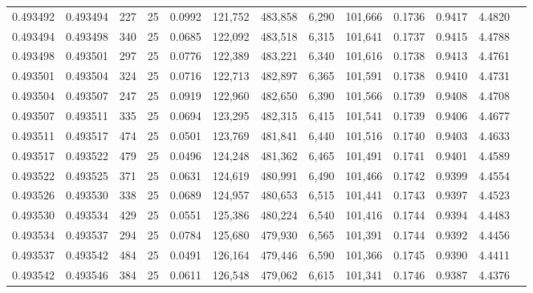 \begin{tabular}{rrrrrrrrrrrrr}
0.493492 & 0.493494 &   227 &  25 &                                     0.0992 & 121,752 & 483,858 &   6,290 & 101,666 & 0.1736 & 0.9417 & 4.4820 \\
0.493494 & 0.493498 &   340 &  25 &                                     0.0685 & 122,092 & 483,518 &   6,315 & 101,641 & 0.1737 & 0.9415 & 4.4788 \\
0.493498 & 0.493501 &   297 &  25 &                                     0.0776 & 122,389 & 483,221 &   6,340 & 101,616 & 0.1738 & 0.9413 & 4.4761 \\
0.493501 & 0.493504 &   324 &  25 &                                     0.0716 & 122,713 & 482,897 &   6,365 & 101,591 & 0.1738 & 0.9410 & 4.4731 \\
0.493504 & 0.493507 &   247 &  25 &                                     0.0919 & 122,960 & 482,650 &   6,390 & 101,566 & 0.1739 & 0.9408 & 4.4708 \\
0.493507 & 0.493511 &   335 &  25 &                                     0.0694 & 123,295 & 482,315 &   6,415 & 101,541 & 0.1739 & 0.9406 & 4.4677 \\
0.493511 & 0.493517 &   474 &  25 &                                     0.0501 & 123,769 & 481,841 &   6,440 & 101,516 & 0.1740 & 0.9403 & 4.4633 \\
0.493517 & 0.493522 &   479 &  25 &                                     0.0496 & 124,248 & 481,362 &   6,465 & 101,491 & 0.1741 & 0.9401 & 4.4589 \\
0.493522 & 0.493525 &   371 &  25 &                                     0.0631 & 124,619 & 480,991 &   6,490 & 101,466 & 0.1742 & 0.9399 & 4.4554 \\
0.493526 & 0.493530 &   338 &  25 &                                     0.0689 & 124,957 & 480,653 &   6,515 & 101,441 & 0.1743 & 0.9397 & 4.4523 \\
0.493530 & 0.493534 &   429 &  25 &                                     0.0551 & 125,386 & 480,224 &   6,540 & 101,416 & 0.1744 & 0.9394 & 4.4483 \\
0.493534 & 0.493537 &   294 &  25 &                                     0.0784 & 125,680 & 479,930 &   6,565 & 101,391 & 0.1744 & 0.9392 & 4.4456 \\
0.493537 & 0.493542 &   484 &  25 &                                     0.0491 & 126,164 & 479,446 &   6,590 & 101,366 & 0.1745 & 0.9390 & 4.4411 \\
0.493542 & 0.493546 &   384 &  25 &                                     0.0611 & 126,548 & 479,062 &   6,615 & 101,341 & 0.1746 & 0.9387 & 4.4376 \\

\end{tabular}

